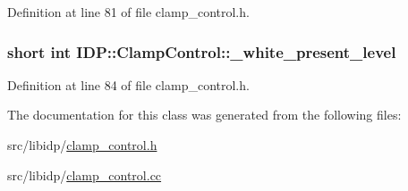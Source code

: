 Definition at line 81 of file clamp\_\-control.h.

\hypertarget{classIDP_1_1ClampControl_a1576dda5ebbae90e0861fa0212e5d743}{
\subsubsection[{\_\-white\_\-present\_\-level}]{\setlength{\rightskip}{0pt plus 5cm}short int {\bf IDP::ClampControl::\_\-white\_\-present\_\-level}}}
\label{classIDP_1_1ClampControl_a1576dda5ebbae90e0861fa0212e5d743}


Definition at line 84 of file clamp\_\-control.h.



The documentation for this class was generated from the following files:\begin{DoxyCompactItemize}
\item 
src/libidp/\hyperlink{clamp__control_8h}{clamp\_\-control.h}\item 
src/libidp/\hyperlink{clamp__control_8cc}{clamp\_\-control.cc}\end{DoxyCompactItemize}
